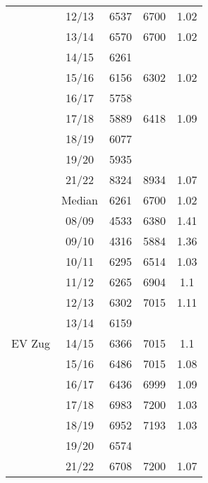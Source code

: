 \begin{longtable}[c]{p{5cm}cccc}
                                                 & 12/13 & 6537 & 6700 & 1.02 \\ 
                                                 & 13/14 & 6570 & 6700 & 1.02 \\ 
                                                 & 14/15 & 6261 & ~ & ~ \\ 
                                                 & 15/16 & 6156 & 6302 & 1.02 \\ 
                                                 & 16/17 & 5758 & ~ & ~ \\ 
                                                 & 17/18 & 5889 & 6418 & 1.09 \\ 
                                                 & 18/19 & 6077 & ~ & ~ \\ 
                                                 & 19/20 & 5935 & ~ & ~ \\ 
                                                 & 21/22 & 8324 & 8934 & 1.07 \\ 
                                                 \cmidrule{2-5}
                                                 & Median & 6261 & 6700 & 1.02 \\
                                                 \cmidrule{1-5}
    \multirow[t]{14}{=}{EV Zug}   & 08/09 & 4533 & 6380 & 1.41 \\ 
                                 & 09/10 & 4316 & 5884 & 1.36 \\ 
                                 & 10/11 & 6295 & 6514 & 1.03 \\ 
                                 & 11/12 & 6265 & 6904 & 1.1 \\ 
                                 & 12/13 & 6302 & 7015 & 1.11 \\ 
                                 & 13/14 & 6159 & ~ & ~ \\ 
                                 & 14/15 & 6366 & 7015 & 1.1 \\ 
                                 & 15/16 & 6486 & 7015 & 1.08 \\ 
                                 & 16/17 & 6436 & 6999 & 1.09 \\ 
                                 & 17/18 & 6983 & 7200 & 1.03 \\ 
                                 & 18/19 & 6952 & 7193 & 1.03 \\ 
                                 & 19/20 & 6574 & ~ & ~ \\ 
                                 & 21/22 & 6708 & 7200 & 1.07 \\ 

\end{longtable}

